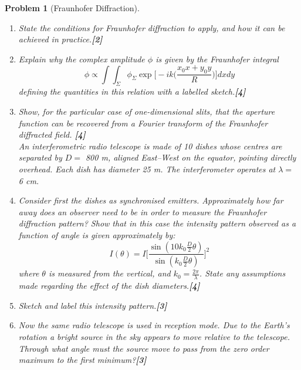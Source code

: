 \documentclass[a4paper]{article}
\theoremstyle{new}
\newtheorem{qns}{Problem}[subsection]
\begin{document}
\begin{qns}[Fraunhofer Diffraction]\leavevmode
\begin{enumerate}[label=(\roman*)]
\item State the conditions for Fraunhofer diffraction to apply, and how it can be achieved in practice.\hfill\textbf{[2]}
\item Explain why the complex amplitude $\phi$ is given by the Fraunhofer integral
$$\phi\propto\int\int_{\Sigma}\phi_{\Sigma}\exp\bigg[-ik\bigg(\frac{x_0x+y_0y}{R}\bigg)\bigg]dxdy$$
defining the quantities in this relation with a labelled sketch.\hfill\textbf{[4]}
\item Show, for the particular case of one-dimensional slits, that the aperture function can be recovered from a Fourier transform of the Fraunhofer diffracted field. \hfill\textbf{[4]}\\[5pt]
An interferometric radio telescope is made of 10 dishes whose centres are separated by $D =$ 800 m, aligned East–West on the equator, pointing directly overhead. Each dish has diameter 25 m. The interferometer operates at $\lambda =$ 6 cm.
\item Consider first the dishes as synchronised emitters. Approximately how far away does an observer need to be in order to measure the Fraunhofer diffraction pattern? Show that in this case the intensity pattern observed as a function of angle is given approximately by:
$$I(\theta)=I\bigg[\frac{\sin(10k_0\frac{D}{2}\theta)}{\sin(k_0\frac{D}{2}\theta)}\bigg]^2$$
where $\theta$ is measured from the vertical, and $k_0=\frac{2\pi}{\lambda}$. State any assumptions made regarding the effect of the dish diameters.\hfill\textbf{[4]}
\item Sketch and label this intensity pattern.\hfill\textbf{[3]}
\item Now the same radio telescope is used in reception mode. Due to the Earth’s rotation a bright source in the sky appears to move relative to the telescope. Through what angle must the source move to pass from the zero order maximum to the first minimum?\hfill\textbf{[3]}
\end{enumerate}
\end{qns}
\end{document}
